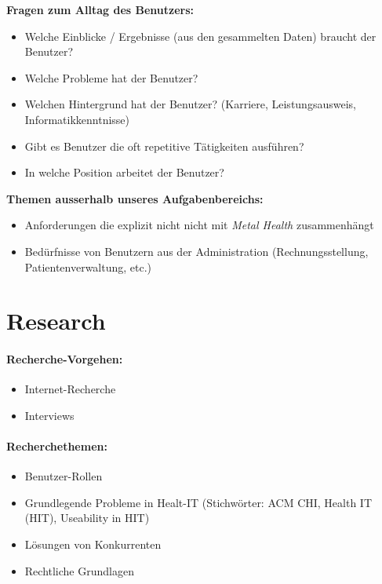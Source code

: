 \documentclass[a4paper]{scrreprt}
\begin{document}
\textbf{Fragen zum Alltag des Benutzers:}

\begin{itemize}
\item Welche Einblicke / Ergebnisse (aus den gesammelten Daten) braucht der Benutzer?
\item Welche Probleme hat der Benutzer?
\item Welchen Hintergrund hat der Benutzer? (Karriere, Leistungsausweis, Informatikkenntnisse)
\item Gibt es Benutzer die oft repetitive Tätigkeiten ausführen?
\item In welche Position arbeitet der Benutzer?
\end{itemize}

\textbf{Themen ausserhalb unseres Aufgabenbereichs:}

\begin{itemize}
\item Anforderungen die explizit nicht nicht mit \textit{Metal Health} zusammenhängt
\item Bedürfnisse von Benutzern aus der Administration (Rechnungsstellung, Patientenverwaltung, etc.)
\end{itemize}



\section{Research}
\paragraph{Recherche-Vorgehen:} 
\begin{itemize}
\item Internet-Recherche
\item Interviews
\end{itemize}


\paragraph{Recherchethemen:} 
\begin{itemize}
\item Benutzer-Rollen
\item Grundlegende Probleme in Healt-IT (Stichwörter: ACM CHI, Health IT (HIT), Useability in HIT)
\item Lösungen von Konkurrenten
\item Rechtliche Grundlagen
\end{itemize}
\end{document}
